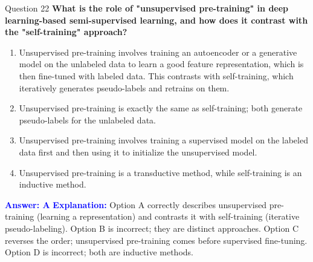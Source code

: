 \documentclass[8pt]{beamer}  %
\begin{document}
	\begin{frame}{Question 22}
		\textbf{What is the role of "unsupervised pre-training" in deep learning-based semi-supervised learning, and how does it contrast with the "self-training" approach?}
		\begin{enumerate}
			\item Unsupervised pre-training involves training an autoencoder or a generative model on the unlabeled data to learn a good feature representation, which is then fine-tuned with labeled data. This contrasts with self-training, which iteratively generates pseudo-labels and retrains on them.
			\item Unsupervised pre-training is exactly the same as self-training; both generate pseudo-labels for the unlabeled data.
			\item Unsupervised pre-training involves training a supervised model on the labeled data first and then using it to initialize the unsupervised model.
			\item Unsupervised pre-training is a transductive method, while self-training is an inductive method.
		\end{enumerate}
		\vspace{0.2cm}
		\textcolor{blue}{\textbf{Answer: A}}
		\vspace{0.2cm}
		\textcolor{blue}{\textbf{Explanation:}} Option A correctly describes unsupervised pre-training (learning a representation) and contrasts it with self-training (iterative pseudo-labeling). Option B is incorrect; they are distinct approaches. Option C reverses the order; unsupervised pre-training comes before supervised fine-tuning. Option D is incorrect; both are inductive methods.
	\end{frame}
	
\end{document}
